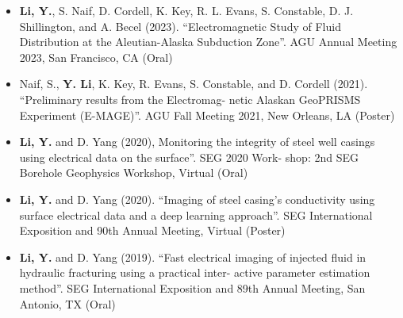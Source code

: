 

\begin{cvparagraph}

  \fontsize{11pt}{1.3em}\selectfont
  \begin{itemize}[leftmargin=2.5ex]
    \item {\textbf{Li, Y.}, S. Naif, D. Cordell, K. Key, R. L. Evans, S. Constable, D. J. Shillington, and A. Becel (2023). “Electromagnetic Study
    of Fluid Distribution at the Aleutian-Alaska Subduction Zone”. AGU Annual Meeting 2023, San Francisco, CA (Oral)}
    \item {Naif, S., \textbf{Y. Li}, K. Key, R. Evans, S. Constable, and D. Cordell (2021). “Preliminary results from the Electromag-
    netic Alaskan GeoPRISMS Experiment (E-MAGE)”. AGU Fall Meeting 2021, New Orleans, LA (Poster)}
    \item {\textbf{Li, Y.} and D. Yang (2020), Monitoring the integrity of steel well casings using electrical data on the surface”. SEG 2020 Work-
    shop: 2nd SEG Borehole Geophysics Workshop, Virtual (Oral)}
    \item {\textbf{Li, Y.} and D. Yang (2020). “Imaging of steel casing’s conductivity using surface electrical data and a deep learning
    approach”. SEG International Exposition and 90th Annual Meeting, Virtual (Poster)}
    \item {\textbf{Li, Y.} and D. Yang (2019). “Fast electrical imaging of injected fluid in hydraulic fracturing using a practical inter-
    active parameter estimation method”. SEG International Exposition and 89th Annual Meeting, San Antonio, TX (Oral)}
  \end{itemize}


\end{cvparagraph}
